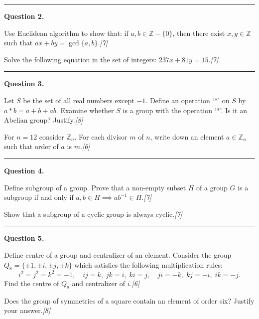 \documentclass[11pt,a4paper]{article}
\newcommand{\pts}[1]{\hfill\textit{[#1]}}
\begin{document}
\medskip\rule{\linewidth}{0.2pt}\medskip

\noindent\textbf{Question 2.}
\begin{parts}
  \item Use Euclidean algorithm to show that: if $a, b \in \mathbb{Z} - \{0\}$, then there exist $x, y \in \mathbb{Z}$ such that $ax + by = \gcd\{a, b\}$.\pts{7}
  \item Solve the following equation in the set of integers: $237x + 81y = 15$.\pts{7}
\end{parts}

\medskip\rule{\linewidth}{0.2pt}\medskip

\noindent\textbf{Question 3.}
\begin{parts}
  \item Let $S$ be the set of all real numbers except $-1$. Define an operation `$*$' on $S$ by $a * b = a + b + ab$. Examine whether $S$ is a group with the operation `$*$'. Is it an Abelian group? Justify.\pts{8}
  \item For $n = 12$ consider $\mathbb{Z}_n$. For each divisor $m$ of $n$, write down an element $a \in \mathbb{Z}_n$ such that order of $a$ is $m$.\pts{6}
\end{parts}

\medskip\rule{\linewidth}{0.2pt}\medskip

\noindent\textbf{Question 4.}
\begin{parts}
  \item Define subgroup of a group. Prove that a non-empty subset $H$ of a group $G$ is a subgroup if and only if $a, b \in H \implies ab^{-1} \in H$.\pts{7}
  \item Show that a subgroup of a cyclic group is always cyclic.\pts{7}
\end{parts}

\medskip\rule{\linewidth}{0.2pt}\medskip

\noindent\textbf{Question 5.}
\begin{parts}
  \item Define centre of a group and centralizer of an element. Consider the group $Q_8 = \{\pm 1, \pm i, \pm j, \pm k\}$ which satisfies the following multiplication rules:
  \[
    i^2 = j^2 = k^2 = -1, \quad ij = k, \; jk = i, \; ki = j, \quad ji = -k, \; kj = -i, \; ik = -j.
  \]
  Find the centre of $Q_8$ and centralizer of $i$.\pts{6}
  \item Does the group of symmetries of a square contain an element of order six? Justify your answer.\pts{8}
\end{parts}
\end{document}

